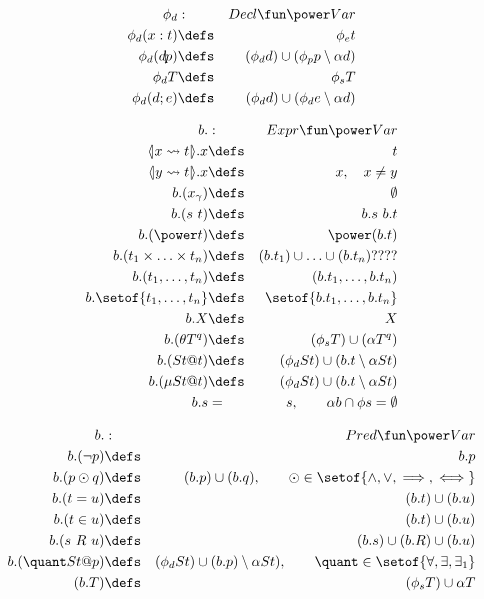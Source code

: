 \begin{eqnarray*}
   \phi_d &:& Decl \fun \power Var
\\ \phi_d (x:t) &\defs& \phi_e t
\\ \phi_d (d\!|\!p) &\defs& (\phi_d d) \cup (\phi_p p \setminus \alpha d)
\\ \phi_d T &\defs& \phi_s T
\\ \phi_d (d;e) &\defs& (\phi_d d) \cup (\phi_d e \setminus \alpha d)
\end{eqnarray*}


\begin{eqnarray*}
   b. &:& Expr \fun \power Var
\\ \bindof{x \bto t}.x &\defs& t
\\ \bindof{y \bto t}.x &\defs& x, \quad x \neq y
\\ b.(x_\gamma) &\defs& \emptyset
\\ b.(s~t) &\defs& b.s ~ b.t
\\ b.(\power t) &\defs& \power (b.t)
\\ b.(t_1 \times \ldots \times t_n) &\defs& (b.t_1) \cup \ldots \cup (b.t_n) ????
\\ b.(t_1, \ldots, t_n) &\defs& (b.t_1,\ldots , b.t_n)
\\ b.\setof{t_1 ,\ldots, t_n} &\defs& \setof{b. t_1,\ldots, b. t_n}
\\ b.X &\defs& X
\\ b.(\theta T^q) &\defs& (\phi_s T) \cup (\alpha T^q)
\\ b.(St @ t) &\defs& (\phi_d St) \cup (b. t \setminus \alpha St)
\\ b.(\mu St @ t) &\defs& (\phi_d St) \cup (b. t \setminus \alpha St)
\\ b.s &=& s, \qquad \alpha b \cap \phi s = \emptyset
\end{eqnarray*}


\begin{eqnarray*}
   b. &:& Pred \fun \power Var
\\ b.(\lnot p) &\defs& b. p
\\ b.(p \odot q) &\defs& (b. p) \cup (b. q), \qquad \odot \in \setof{\land,\lor,\implies,\iff}
\\ b.(t=u) &\defs& (b. t) \cup (b. u)
\\ b.(t \in u) &\defs& (b. t) \cup (b. u)
\\ b.(s~R~u) &\defs& (b. s) \cup (b. R) \cup (b. u)
\\ b.(\quant St @ p) &\defs& (\phi_d St) \cup (b. p) \setminus \alpha St), \qquad \quant \in \setof{\forall,\exists,\exists_1}
\\ (b. T) &\defs& (\phi_s T) \cup \alpha T
\end{eqnarray*}


